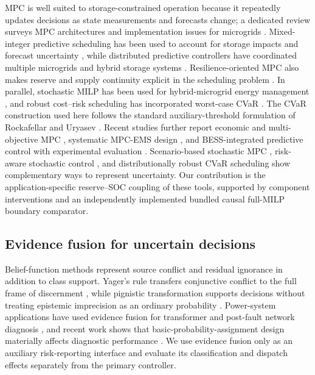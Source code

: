 MPC is well suited to storage-constrained operation because it repeatedly
updates decisions as state measurements and forecasts change; a dedicated
review surveys MPC architectures and implementation issues for microgrids
\citep{hu2021mpcoverview}. Mixed-integer predictive scheduling has been used
to account for storage impacts and forecast uncertainty
\citep{zhang2015smartmicrogrid}, while distributed predictive controllers
have coordinated multiple microgrids and hybrid storage systems
\citep{dao2019hierarchical,garciatorres2019network}. Resilience-oriented MPC
also makes reserve and supply continuity explicit in the scheduling problem
\citep{tobajas2022resilience}. In parallel, stochastic MILP has been used for
hybrid-microgrid energy management \citep{franke2020stochasticmilp}, and
robust cost--risk scheduling has incorporated worst-case CVaR
\citep{ji2018robustcvar}. The CVaR construction used here follows the
standard auxiliary-threshold formulation of Rockafellar and Uryasev
\citep{rockafellar2000cvar}. Recent studies further report economic and
multi-objective MPC \citep{vasquez2023mpcmultiobjective}, systematic
MPC-EMS design \citep{pajares2023mpcmethodology}, and BESS-integrated
predictive control with experimental evaluation
\citep{sepehrzad2023dcmicrogrid}. Scenario-based stochastic MPC
\citep{alarcon2023scenariompc}, risk-aware stochastic control
\citep{tereza2023riskaware}, and distributionally robust CVaR scheduling
\citep{zhang2023drcvar} show complementary ways to represent uncertainty.
Our contribution is the application-specific reserve--SOC coupling of these
tools, supported by component interventions and an independently implemented
bundled causal full-MILP boundary comparator.

\subsection{Evidence fusion for uncertain decisions}

Belief-function methods represent source conflict and residual ignorance in
addition to class support. Yager's rule transfers conjunctive conflict to the
full frame of discernment \citep{yager1987dempster}, while pignistic
transformation supports decisions without treating epistemic imprecision as
an ordinary probability \citep{denoeux2019decision}. Power-system applications
have used evidence fusion for transformer and post-fault network diagnosis
\citep{demirci2022transformer,wu2024distribution}, and recent work shows that
basic-probability-assignment design materially affects diagnostic performance
\citep{guan2025optimized}. We use evidence fusion only as an auxiliary
risk-reporting interface and evaluate its classification and dispatch effects
separately from the primary controller.

